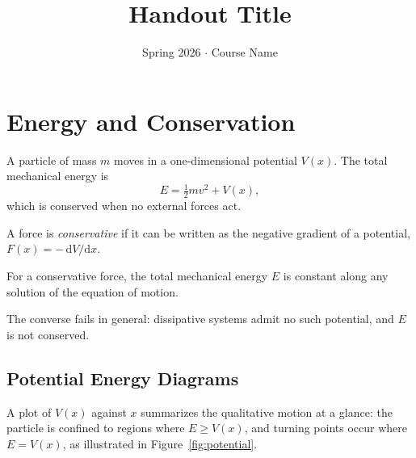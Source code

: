 \documentclass[11pt]{article}
\title{Handout Title}
\date{Spring 2026 $\cdot$ Course Name}
\begin{document}
\maketitle


\section{Energy and Conservation}

A particle of mass $m$ moves in a one-dimensional potential
$V(x)$. The total mechanical energy is
\begin{equation}
  E = \tfrac{1}{2} m v^2 + V(x),
\end{equation}
which is conserved when no external forces act.

\begin{important}
\begin{definition}
A force is \emph{conservative} if it can be written as the
negative gradient of a potential, $F(x) = -\,\mathrm{d}V/\mathrm{d}x$.
\end{definition}
\end{important}

\begin{mainresult}
\begin{theorem}
For a conservative force, the total mechanical energy $E$ is
constant along any solution of the equation of motion.
\end{theorem}
\end{mainresult}

\begin{remark}
The converse fails in general: dissipative systems admit no
such potential, and $E$ is not conserved.
\end{remark}

\subsection{Potential Energy Diagrams}

A plot of $V(x)$ against $x$ summarizes the qualitative motion at a
glance: the particle is confined to regions where $E \ge V(x)$, and
turning points occur where $E = V(x)$, as illustrated in
Figure~\ref{fig:potential}.
\end{document}
